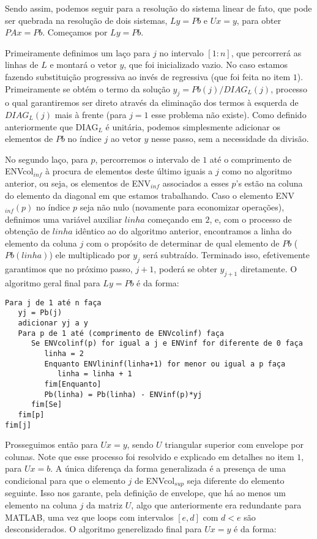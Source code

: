 \documentclass[a4paper, 12pt]{article}
\begin{document}
Sendo assim, podemos seguir para a resolução do sistema linear de fato, que pode ser quebrada na resolução de dois sistemas, $Ly = Pb$ e $Ux = y$, para obter $PAx=Pb$. Começamos por $Ly = Pb$.

Primeiramente definimos um laço para $j$ no intervalo $[1:n]$, que percorrerá as linhas de $L$ e montará o vetor $y$, que foi inicializado vazio. No caso estamos fazendo substituição progressiva ao invés de regressiva (que foi feita no item $1$). Primeiramente se obtém o termo da solução $y_j = Pb(j)/DIAG_L(j)$, processo o qual garantiremos ser direto através da eliminação dos termos à esquerda de $DIAG_L(j)$ mais à frente (para $j=1$ esse problema não existe). Como definido anteriormente que DIAG$_L$ é unitária, podemos simplesmente adicionar os elementos de $Pb$ no índice $j$ ao vetor $y$ nesse passo, sem a necessidade da divisão.

No segundo laço, para $p$, percorremos o intervalo de $1$ até o comprimento de ENVcol$_{inf}$ à procura de elementos deste último iguais a $j$ como no algoritmo anterior, ou seja, os elementos de ENV$_{inf}$ associados a esses $p$'s estão na coluna do elemento da diagonal em que estamos trabalhando. Caso o elemento ENV$_{inf}(p)$ no índice $p$ seja não nulo (novamente para economizar operações), definimos uma variável auxiliar $linha$ começando em $2$, e, com o processo de obtenção de $linha$ idêntico ao do algoritmo anterior, encontramos a linha do elemento da coluna $j$ com o propósito de determinar de qual elemento de $Pb$ ($Pb(linha)$) ele multiplicado por $y_j$ será subtraído. Terminado isso, efetivemente garantimos que no próximo passo, $j+1$, poderá se obter $y_{j+1}$ diretamente. O algoritmo geral final para $Ly = Pb$ é da forma:

\begin{verbatim}
Para j de 1 até n faça
   yj = Pb(j)
   adicionar yj a y
   Para p de 1 até (comprimento de ENVcolinf) faça
      Se ENVcolinf(p) for igual a j e ENVinf for diferente de 0 faça
         linha = 2
         Enquanto ENVlininf(linha+1) for menor ou igual a p faça
            linha = linha + 1
         fim[Enquanto]
         Pb(linha) = Pb(linha) - ENVinf(p)*yj
      fim[Se]
   fim[p]
fim[j]
\end{verbatim}

Prosseguimos então para $Ux = y$, sendo $U$ triangular superior com envelope por colunas. Note que esse processo foi resolvido e explicado em detalhes no item $1$, para $Ux = b$. A única diferença da forma generalizada é a presença de uma condicional para que o elemento $j$ de ENVcol$_{sup}$ seja diferente do elemento seguinte. Isso nos garante, pela definição de envelope, que há ao menos um elemento na coluna $j$ da matriz $U$, algo que anteriormente era redundante para MATLAB, uma vez que loops com intervalos $[e,d]$ com $d<e$ são desconsiderados. O algoritmo generelizado final para $Ux = y$ é da forma:
\end{document}
